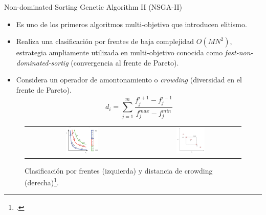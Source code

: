 \documentclass{beamer}
\begin{document}
\begin{frame}{Non-dominated Sorting Genetic Algorithm II (NSGA-II)}
\begin{itemize}
\scriptsize
\item Es uno de los primeros algoritmos multi-objetivo que introducen elitismo.
\item Realiza una clasificación por frentes de baja complejidad $O(MN^2)$, estrategia ampliamente utilizada en multi-objetivo conocida como \textit{fast-non-dominated-sortig} (convergencia al frente de Pareto).
\item Considera un operador de amontonamiento o \textit{crowding} (diversidad en el frente de Pareto).
\begin{equation*}
   d_i = \sum_{j=1}^m \frac{f_j^{i+1} - f_j^{i-1}   }{f_j^{max} - f_j^{min}}
\end{equation*}
\end{itemize}

\begin{figure}[H]
\centering
\begin{tabular}{c c}
\includegraphics[width=0.3\textwidth]{Images/fronts.png} & \includegraphics[width=0.3\textwidth]{Images/crowding_nsgaii.jpg} 
\end{tabular}
\caption{\scriptsize Clasificación por frentes (izquierda) y distancia de crowding (derecha)\footcite{kadlec2016multi}.}
\end{figure}
\end{frame}
\end{document}
